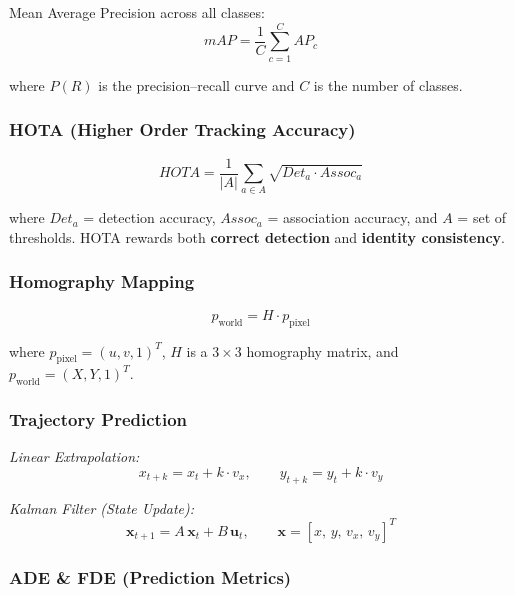 \documentclass[12pt,letterpaper]{article}
\begin{document}
Mean Average Precision across all classes:
\begin{equation}
mAP = \frac{1}{C} \sum_{c=1}^{C} AP_c
\end{equation}

where $P(R)$ is the precision--recall curve and $C$ is the number of classes.

\subsubsection{HOTA (Higher Order Tracking Accuracy)}

\begin{equation}
HOTA = \frac{1}{|A|} \sum_{a \in A} \sqrt{Det_a \cdot Assoc_a}
\end{equation}

where $Det_a$ = detection accuracy, $Assoc_a$ = association accuracy, and $A$ = set of thresholds.
HOTA rewards both \textbf{correct detection} and \textbf{identity consistency}.

\subsubsection{Homography Mapping}

\begin{equation}
p_{\text{world}} = H \cdot p_{\text{pixel}}
\end{equation}

where $p_{\text{pixel}} = (u, v, 1)^T$, $H$ is a $3 \times 3$ homography matrix, and $p_{\text{world}} = (X, Y, 1)^T$.

\subsubsection{Trajectory Prediction}

\textit{Linear Extrapolation:}
\begin{equation}
x_{t+k} = x_t + k \cdot v_x, \qquad y_{t+k} = y_t + k \cdot v_y
\end{equation}

\textit{Kalman Filter (State Update):}
\begin{equation}
\mathbf{x}_{t+1} = A\, \mathbf{x}_t + B\, \mathbf{u}_t, \qquad \mathbf{x} = [x,\, y,\, v_x,\, v_y]^T
\end{equation}

\subsubsection{ADE \& FDE (Prediction Metrics)}
\end{document}
